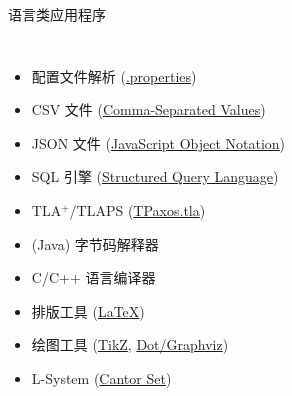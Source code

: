 \begin{frame}{}
  \begin{center}
    {\Large 语言类应用程序}
  \end{center}

  \begin{columns}
      \begin{itemize}
        \setlength{\itemsep}{6pt}
        \item 配置文件解析 (\href{https://en.wikipedia.org/wiki/.properties}{.properties})
        \item CSV 文件 (\href{https://en.wikipedia.org/wiki/Comma-separated_values\#/media/File:CsvDelimited001.svg}{Comma-Separated Values})
        \item JSON 文件 (\href{https://en.wikipedia.org/wiki/JSON\#Syntax}{JavaScript Object Notation})
        \vspace{8pt}
        \pause
        \item SQL 引擎 (\href{https://en.wikipedia.org/wiki/SQL_syntax}{Structured Query Language})
        \item TLA$^{+}$/TLAPS (\href{https://github.com/Starydark/PaxosStore-tla/blob/master/theorem\%20proving/TPaxos.tla}{TPaxos.tla})
        \item (Java) 字节码解释器
        \item C/C++ 语言编译器
        \vspace{8pt}
        \pause
        \item 排版工具 (\href{https://github.com/courses-at-nju-by-hfwei/compilers-lectures/blob/master/2021/0-overview/parts/overview.tex}{\LaTeX})
        \item 绘图工具 (\href{https://www.overleaf.com/learn/latex/TikZ_package}{TikZ},
          \href{https://renenyffenegger.ch/notes/tools/Graphviz/examples/index}{Dot/Graphviz})
        \item L-System (\href{https://en.wikipedia.org/wiki/L-system\#Example_3:_Cantor_set}{Cantor Set})
      \end{itemize}
  \end{columns}
\end{frame}

\begin{frame}{}
  \begin{center}
    \begin{columns}
    \end{columns}
  \end{center}
\end{frame}

